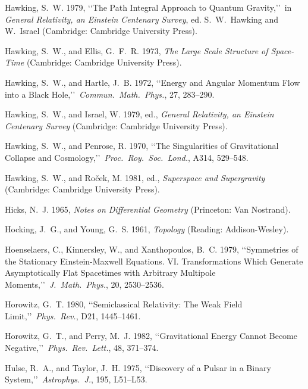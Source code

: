 \item Hawking, S.~W. 1979, \lq\lq The Path Integral Approach to Quantum Gravity,\rq\rq\ in \emph{General Relativity, an Einstein Centenary Survey}, ed. S.~W.~Hawking and W.~Israel (Cambridge: Cambridge University Press).
\item Hawking, S.~W., and Ellis, G.~F.~R. 1973, \emph{The Large Scale Structure of Space-Time} (Cambridge: Cambridge University Press).
\item Hawking, S.~W., and Hartle, J.~B. 1972, \lq\lq Energy and Angular Momentum Flow into a Black Hole,\rq\rq\ \emph{Commun.\ Math.\ Phys.}, 27, 283--290.
\item Hawking, S.~W., and Israel, W. 1979, ed., \emph{General Relativity, an Einstein Centenary Survey} (Cambridge: Cambridge University Press).
\item Hawking, S.~W., and Penrose, R. 1970, \lq\lq The Singularities of Gravitational Collapse and Cosmology,\rq\rq\ \emph{Proc.\ Roy.\ Soc.\ Lond.}, A314, 529--548.
\item Hawking, S.~W., and Ro{\v c}ek, M. 1981, ed., \emph{Superspace and Supergravity} (Cambridge: Cambridge University Press).
\item Hicks, N.~J. 1965, \emph{Notes on Differential Geometry} (Princeton: Van Nostrand).
\item Hocking, J.~G., and Young, G.~S. 1961, \emph{Topology} (Reading: Addison-Wesley).
\item Hoenselaers, C., Kinnersley, W., and Xanthopoulos, B.~C. 1979, \lq\lq Symmetries of the Stationary Einstein-Maxwell Equations. VI. Transformations Which Generate Asymptotically Flat Spacetimes with Arbitrary Multipole Moments,\rq\rq\ \emph{J.\ Math.\ Phys.}, 20, 2530--2536.
\item Horowitz, G.~T. 1980, \lq\lq Semiclassical Relativity: The Weak Field Limit,\rq\rq\ \emph{Phys.\ Rev.}, D21, 1445--1461.
\item Horowitz, G.~T., and Perry, M.~J. 1982, \lq\lq Gravitational Energy Cannot Become Negative,\rq\rq\ \emph{Phys.\ Rev.\ Lett.}, 48, 371--374.
\item Hulse, R.~A., and Taylor, J.~H. 1975, \lq\lq Discovery of a Pulsar in a Binary System,\rq\rq\ \emph{Astrophys.\ J.}, 195, L51--L53.

